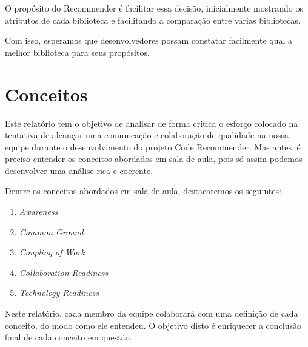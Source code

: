 \documentclass{acm_proc_article-sp}
\begin{document}
O propósito do Recommender é facilitar essa decisão, inicialmente mostrando os atributos de cada biblioteca e facilitando a comparação entre várias bibliotecas.

Com isso, esperamos que desenvolvedores possam constatar facilmente qual a melhor
biblioteca para seus propósitos.


\section{Conceitos}


Este relatório tem o objetivo de analisar de forma crítica o esforço colocado na tentativa de alcançar uma comunicação e colaboração de qualidade na nossa equipe durante o desenvolvimento do projeto Code Recommender. Mas antes, é preciso entender os conceitos abordados em sala de aula, pois só assim podemos desenvolver uma análise rica e coerente.

Dentre os conceitos abordados em sala de aula, destacaremos os seguintes:

\begin{enumerate}
\item \textsl{Awareness}
\item \textsl{Common Ground}
\item \textsl{Coupling of Work}
\item \textsl{Collaboration Readiness}
\item \textsl{Technology Readiness}
\end{enumerate}
Neste relatório, cada membro da equipe colaborará com uma definição de cada conceito, do modo como ele entendeu. O objetivo disto é enriquecer a conclusão final de cada conceito em questão.
\end{document}

